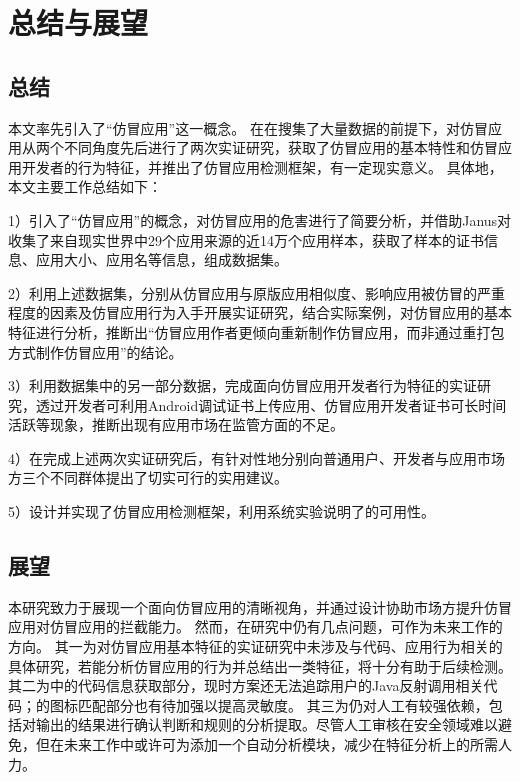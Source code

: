 \chapter{总结与展望}
\label{chp:future}

\section{总结}
本文率先引入了``仿冒应用''这一概念。
在在搜集了大量数据的前提下，对仿冒应用从两个不同角度先后进行了两次实证研究，获取了仿冒应用的基本特性和仿冒应用开发者的行为特征，并推出了仿冒应用检测框架\mytool ，有一定现实意义。
具体地，本文主要工作总结如下：

1）引入了``仿冒应用''的概念，对仿冒应用的危害进行了简要分析，并借助Janus对收集了来自现实世界中29个应用来源的近14万个应用样本，获取了样本的证书信息、应用大小、应用名等信息，组成数据集。

2）利用上述数据集，分别从仿冒应用与原版应用相似度、影响应用被仿冒的严重程度的因素及仿冒应用行为入手开展实证研究，结合实际案例，对仿冒应用的基本特征进行分析，推断出``仿冒应用作者更倾向重新制作仿冒应用，而非通过重打包方式制作仿冒应用''的结论。

3）利用数据集中的另一部分数据，完成面向仿冒应用开发者行为特征的实证研究，透过开发者可利用Android调试证书上传应用、仿冒应用开发者证书可长时间活跃等现象，推断出现有应用市场在监管方面的不足。

4）在完成上述两次实证研究后，有针对性地分别向普通用户、开发者与应用市场方三个不同群体提出了切实可行的实用建议。

5）设计并实现了仿冒应用检测框架\mytool ，利用系统实验说明了\mytool 的可用性。


\section{展望}

本研究致力于展现一个面向仿冒应用的清晰视角，并通过设计\mytool 协助市场方提升仿冒应用对仿冒应用的拦截能力。
然而，在研究中仍有几点问题，可作为未来工作的方向。
其一为对仿冒应用基本特征的实证研究中未涉及与代码、应用行为相关的具体研究，若能分析仿冒应用的行为并总结出一类特征，将十分有助于后续检测。
其二为\mytool 中\componentB 的代码信息获取部分，现时方案还无法追踪用户的Java反射调用相关代码；\mytool 的图标匹配部分也有待加强以提高灵敏度。
其三为\mytool 仍对人工有较强依赖，包括对输出的结果进行确认判断和规则的分析提取。尽管人工审核在安全领域难以避免，但在未来工作中或许可为\mytool 添加一个自动分析模块，减少在特征分析上的所需人力。
